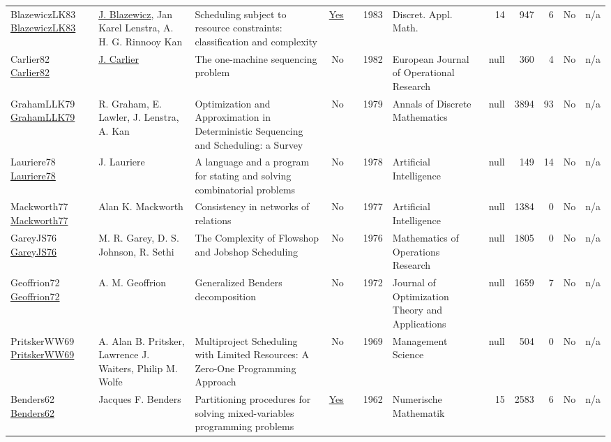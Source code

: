 {\begin{longtable}{>{\raggedright\arraybackslash}p{3cm}>{\raggedright\arraybackslash}p{6cm}>{\raggedright\arraybackslash}p{6.5cm}rrrp{2.5cm}rrrrr}
BlazewiczLK83 \href{https://doi.org/10.1016/0166-218X(83)90012-4}{BlazewiczLK83} & \hyperref[auth:a773]{J. Blazewicz}, Jan Karel Lenstra, A. H. G. Rinnooy Kan & Scheduling subject to resource constraints: classification and complexity & \href{../works/BlazewiczLK83.pdf}{Yes} & \cite{BlazewiczLK83} & 1983 & Discret. Appl. Math. & 14 & 947 & 6 & No & n/a\\
Carlier82 \href{http://dx.doi.org/10.1016/s0377-2217(82)80007-6}{Carlier82} & \hyperref[auth:a854]{J. Carlier} & The one-machine sequencing problem & No & \cite{Carlier82} & 1982 & European Journal of Operational Research & null & 360 & 4 & No & n/a\\
GrahamLLK79 \href{http://dx.doi.org/10.1016/s0167-5060(08)70356-x}{GrahamLLK79} & R. Graham, E. Lawler, J. Lenstra, A. Kan & Optimization and Approximation in Deterministic Sequencing and Scheduling: a Survey & No & \cite{GrahamLLK79} & 1979 & Annals of Discrete Mathematics & null & 3894 & 93 & No & n/a\\
Lauriere78 \href{http://dx.doi.org/10.1016/0004-3702(78)90029-2}{Lauriere78} & J. Lauriere & A language and a program for stating and solving combinatorial problems & No & \cite{Lauriere78} & 1978 & Artificial Intelligence & null & 149 & 14 & No & n/a\\
Mackworth77 \href{http://dx.doi.org/10.1016/0004-3702(77)90007-8}{Mackworth77} & Alan K. Mackworth & Consistency in networks of relations & No & \cite{Mackworth77} & 1977 & Artificial Intelligence & null & 1384 & 0 & No & n/a\\
GareyJS76 \href{http://dx.doi.org/10.1287/moor.1.2.117}{GareyJS76} & M. R. Garey, D. S. Johnson, R. Sethi & The Complexity of Flowshop and Jobshop Scheduling & No & \cite{GareyJS76} & 1976 & Mathematics of Operations Research & null & 1805 & 0 & No & n/a\\
Geoffrion72 \href{http://dx.doi.org/10.1007/bf00934810}{Geoffrion72} & A. M. Geoffrion & Generalized Benders decomposition & No & \cite{Geoffrion72} & 1972 & Journal of Optimization Theory and Applications & null & 1659 & 7 & No & n/a\\
PritskerWW69 \href{http://dx.doi.org/10.1287/mnsc.16.1.93}{PritskerWW69} & A. Alan B. Pritsker, Lawrence J. Waiters, Philip M. Wolfe & Multiproject Scheduling with Limited Resources: A Zero-One Programming Approach & No & \cite{PritskerWW69} & 1969 & Management Science & null & 504 & 0 & No & n/a\\
Benders62 \href{http://dx.doi.org/10.1007/bf01386316}{Benders62} & Jacques F. Benders & Partitioning procedures for solving mixed-variables programming problems & \href{../works/Benders62.pdf}{Yes} & \cite{Benders62} & 1962 & Numerische Mathematik & 15 & 2583 & 6 & No & n/a\\
\end{longtable}
}

